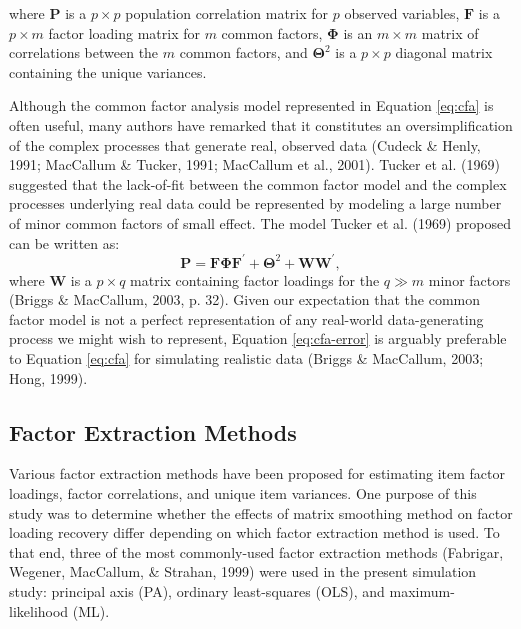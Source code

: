 \documentclass[
  english,
  man]{apa6}
\begin{document}
where \(\mathbf{P}\) is a \(p \times p\) population correlation matrix for \(p\) observed variables, \(\mathbf{F}\) is a \(p \times m\) factor loading matrix for \(m\) common factors, \(\mathbf{\Phi}\) is an \(m \times m\) matrix of correlations between the \(m\) common factors, and \(\mathbf{\Theta}^2\) is a \(p \times p\) diagonal matrix containing the unique variances.

Although the common factor analysis model represented in Equation \eqref{eq:cfa} is often useful, many authors have remarked that it constitutes an oversimplification of the complex processes that generate real, observed data (Cudeck \& Henly, 1991; MacCallum \& Tucker, 1991; MacCallum et al., 2001). Tucker et al. (1969) suggested that the lack-of-fit between the common factor model and the complex processes underlying real data could be represented by modeling a large number of minor common factors of small effect. The model Tucker et al. (1969) proposed can be written as:
\begin{equation}
\mathbf{P} = \mathbf{F} \mathbf{\Phi} \mathbf{F}^{\prime} + \mathbf{\Theta}^2 + \mathbf{WW}^{\prime},
\label{eq:cfa-error}
\end{equation}
where \(\mathbf{W}\) is a \(p \times q\) matrix containing factor loadings for the \(q \gg m\) minor factors (Briggs \& MacCallum, 2003, p. 32). Given our expectation that the common factor model is not a perfect representation of any real-world data-generating process we might wish to represent, Equation \eqref{eq:cfa-error} is arguably preferable to Equation \eqref{eq:cfa} for simulating realistic data (Briggs \& MacCallum, 2003; Hong, 1999).

\hypertarget{factor-extraction-methods}{%
\subsection{Factor Extraction Methods}\label{factor-extraction-methods}}

Various factor extraction methods have been proposed for estimating item factor loadings, factor correlations, and unique item variances. One purpose of this study was to determine whether the effects of matrix smoothing method on factor loading recovery differ depending on which factor extraction method is used. To that end, three of the most commonly-used factor extraction methods (Fabrigar, Wegener, MacCallum, \& Strahan, 1999) were used in the present simulation study: principal axis (PA), ordinary least-squares (OLS), and maximum-likelihood (ML).
\end{document}
